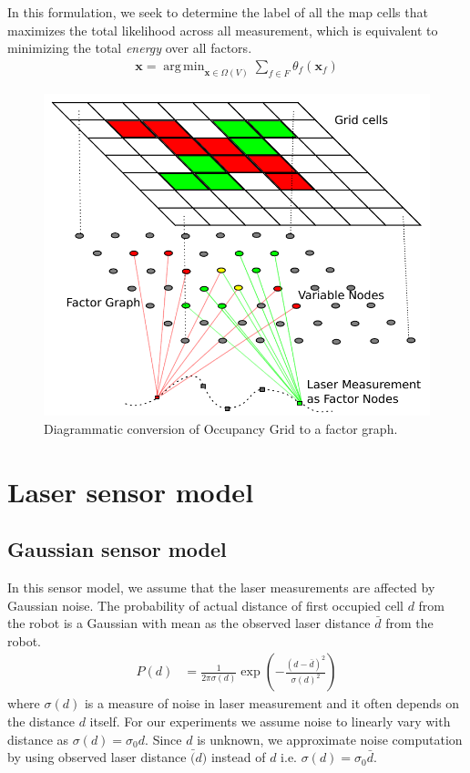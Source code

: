 \documentclass[letterpaper, 10 pt, conference]{ieeeconf} %
\DeclareMathOperator*{\argmin}{arg\,min}
\newcommand{\vect}[1]{\mathbf{#1}}
\begin{document}
In this formulation, we seek to determine the label of all the map cells that
maximizes the total likelihood across all measurement, which is equivalent to
minimizing the total \emph{energy} over all factors.
\begin{align}
  \vect{x} = \argmin_{\vect{x} \in \Omega(V)} \sum_{f \in F} \theta_f(\vect{x}_f)
\end{align}
\begin{figure}
  \includegraphics[width=\columnwidth]{../figures/factorgraph/factorgraph.pdf}
  \caption{Diagrammatic conversion of Occupancy Grid to a factor graph.}
  \label{fig:factor-graph}
\end{figure}

\section{Laser sensor model}
\subsection{Gaussian sensor model}
In this sensor model, we assume that the laser measurements are affected by Gaussian noise. The probability of actual distance of first occupied cell $d$ from the robot is a Gaussian with mean as the observed laser distance $\bar{d}$ from the robot.
\begin{align}
  P(d) &= \frac{1}{2\pi\sigma(d)}\exp\left(-\frac{(d - \bar{d})^2}{\sigma(d)^2}\right)
\end{align}
where $\sigma(d)$ is a measure of noise in laser measurement and it often depends on the distance $d$ itself. For our experiments we assume noise to linearly vary with distance as $\sigma(d) = \sigma_0d$. Since $d$ is unknown, we approximate noise computation by using observed laser distance $\bar(d)$ instead of $d$ i.e. $\sigma(d) = \sigma_0\bar{d}$.
\end{document}
